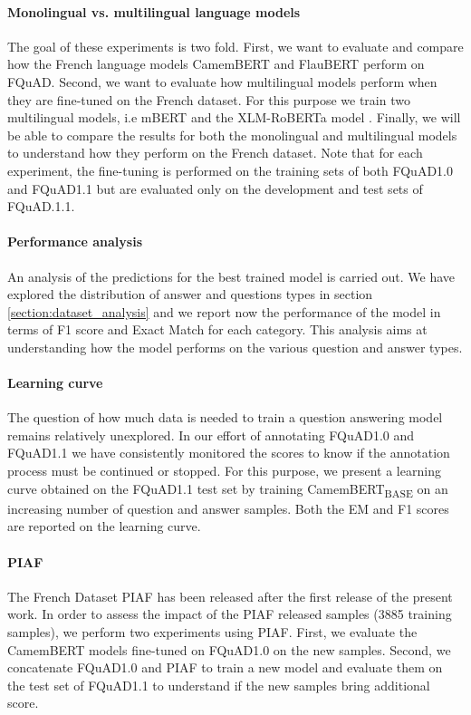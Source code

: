 \documentclass{article}
\begin{document}
\paragraph{Monolingual vs. multilingual language models}{
The goal of these experiments is two fold.
First, we want to evaluate and compare how the French language models CamemBERT \citep{camembert} and FlauBERT \citep{flaubert} perform on FQuAD. 
Second, we want to evaluate how multilingual models perform when they are fine-tuned on the French dataset. 
For this purpose we train two multilingual models, i.e mBERT \citep{multilingual-bert} and the XLM-RoBERTa model \citep{xlmr}.
Finally, we will be able to compare the results for both the monolingual and multilingual models to understand how they perform on the French dataset.
Note that for each experiment, the fine-tuning is performed on the training sets of both FQuAD1.0 and FQuAD1.1 but are evaluated only on the development and test sets of FQuAD.1.1.
}

\paragraph{Performance analysis}{
An analysis of the predictions for the best trained model is carried out.
We have explored the distribution of answer and questions types in section \ref{section:dataset_analysis} and we report now the performance of the model in terms of F1 score and Exact Match for each category.
This analysis aims at understanding how the model performs on the various question and answer types.
}

\paragraph{Learning curve}{
The question of how much data is needed to train a question answering model remains relatively unexplored.
In our effort of annotating FQuAD1.0 and FQuAD1.1 we have consistently monitored the scores to know if the annotation process must be continued or stopped.
For this purpose, we present a learning curve obtained on the FQuAD1.1 test set by training CamemBERT\textsubscript{BASE} on an increasing number of question and answer samples.
Both the EM and F1 scores are reported on the learning curve.
}

\paragraph{PIAF}{
The French Dataset PIAF has been released after the first release of the present work.
In order to assess the impact of the PIAF released samples (3885 training samples), we perform two experiments using PIAF.
First, we evaluate the CamemBERT models fine-tuned on FQuAD1.0 on the new samples.
Second, we concatenate FQuAD1.0 and PIAF to train a new model and evaluate them on the test set of FQuAD1.1 to understand if the new samples bring additional score.
}
\end{document}
